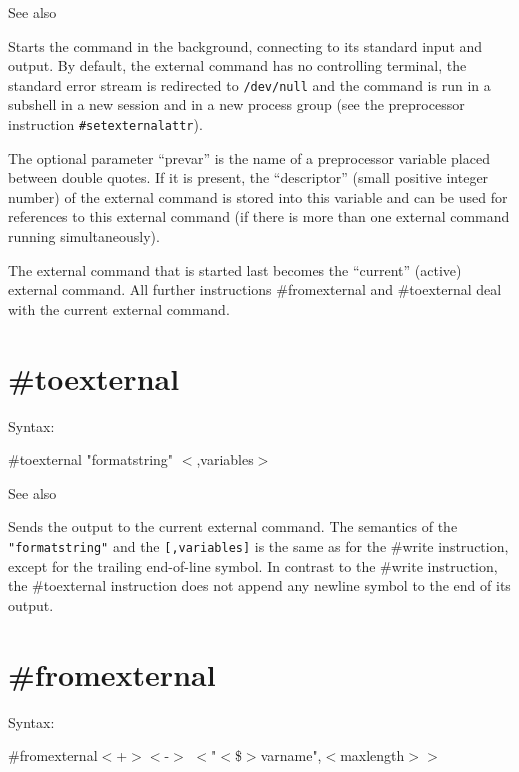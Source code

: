 \noindent See also

\noindent Starts the command in the background, 
connecting to its standard input and output. By default, the external 
command has no controlling terminal, the standard error stream is 
redirected to \verb|/dev/null| and the command is run in a subshell in a 
new session and in a new process group (see the preprocessor instruction 
\verb|#setexternalattr|).

The optional parameter ``prevar'' is the name of a preprocessor variable 
placed between double quotes. If it is present, the ``descriptor'' (small 
positive integer number) of the external command is stored into this 
variable and can be used for references to this external command (if there 
is more than one external command running simultaneously).

The external command that is started last becomes the ``current'' (active) 
external command.  All further instructions 
\#fromexternal and \#toexternal 
deal with the current external command.


\section{\#toexternal}
\label{toexternalcommunication}

\noindent Syntax:

\#toexternal "formatstring" $<$,variables$>$

\noindent See also

\noindent Sends the output to the current 
external command. The semantics of the 
\verb|"formatstring"| and the \verb|[,variables]| is the same as for the 
\#write instruction, except for the trailing end-of-line symbol. In 
contrast to the \#write instruction, the \#toexternal instruction does not 
append any newline symbol to the end of its output.


\section{\#fromexternal}
\label{fromexternalcommunication}

\noindent Syntax:

\#fromexternal$<$+$>$$<$-$>$ $<$"$<$\$$>$varname",$<$maxlength$>$$>$

